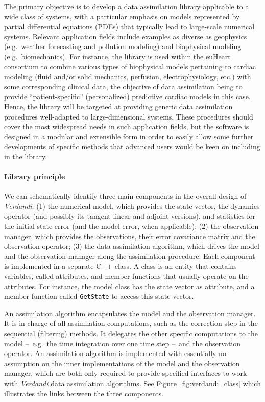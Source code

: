 \documentclass{tufte-book}
\begin{document}
The primary objective is to develop a data assimilation library applicable to a wide class of systems, with a particular emphasis on models represented by partial differential equations (PDEs) that typically lead to large-scale numerical systems. Relevant application fields include examples as diverse as geophysics (e.g.~weather forecasting and pollution modeling) and biophysical modeling (e.g.~biomechanics). For instance, the library is used within the euHeart consortium to combine various types of biophysical models pertaining to cardiac modeling (fluid and/or solid mechanics, perfusion, electrophysiology, etc.) with some corresponding clinical data, the objective of data assimilation being to provide ``patient-specific'' (personalized) predictive cardiac models in this case. Hence, the library will be targeted at providing generic data assimilation procedures well-adapted to large-dimensional systems. These procedures should cover the most widespread needs in such application fields, but the software is designed in a modular and extensible form in order to easily allow some further developments of specific methods that advanced users would be keen on including in the library.

\paragraph{Library principle}

We can schematically identify three main components in the overall design of \emph{Verdandi}: (1) the numerical model, which provides the state vector, the dynamics operator (and possibly its tangent linear and adjoint versions), and statistics for the initial state error (and the model error, when applicable);
(2) the observation manager, which provides the observations, their error covariance matrix and the observation operator; (3) the data assimilation algorithm, which drives the model and the observation manager along the assimilation procedure. Each component is implemented in a separate C++ class. A class is an entity that contains variables, called attributes, and member functions that usually operate on the attributes. For instance, the model class has the state vector as attribute, and a member function called \verb|GetState| to access this state vector.

An assimilation algorithm encapsulates the model and the observation manager. It is in charge of all assimilation computations, such as the correction step in the sequential (filtering) methods. It delegates the other specific computations to the model --~e.g.~the time integration over one time step --~and the observation operator. An assimilation algorithm is implemented with essentially no assumption on the inner implementations of the model and the observation manager, which are both only required to provide  specified interfaces to work with \emph{Verdandi} data assimilation algorithms. See Figure~\ref{fig:verdandi_class} which illustrates the links between the three components.
\end{document}
